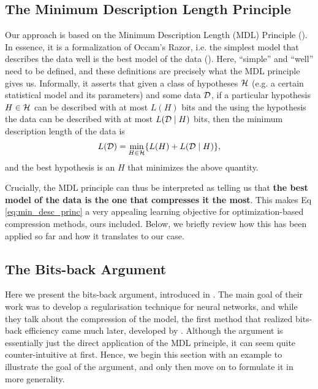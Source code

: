 \subsection{The Minimum Description Length Principle} 
\label{sec:mdl}
Our approach is based on the Minimum Description Length (MDL) Principle
(\cite{rissanen1986stochastic}). In essence, it is a formalization of Occam's
Razor, i.e. the simplest model that describes the data well is the best model of
the data (\cite{grünwald2007minimum}). Here, ``simple'' and ``well'' need to be
defined, and these definitions are precisely what the MDL principle gives us.
Informally, it asserts that given a class of hypotheses $\mathcal{H}$ (e.g. a certain
statistical model and its parameters) and some data $\mathcal{D}$, if a particular
hypothesis $H \in \mathcal{H}$ can be described with at most $L(H)$ bits and the using the
hypothesis the data can be described with at most $L(\mathcal{D} \mid H)$ bits, then the
minimum description length of the data is
\begin{equation}
\label{eq:min_desc_princ}
  L(\mathcal{D}) = \min_{H \in \mathcal{H}}\{ L(H) + L(\mathcal{D} \mid H) \},
\end{equation}
and the best hypothesis is an $H$ that minimizes the above quantity.
\par
Crucially, the MDL principle can thus be interpreted as telling us that
\textbf{the best model of the data is the one that compresses it the most}.
This makes Eq \ref{eq:min_desc_princ} a very appealing learning objective for
optimization-based compression methods, ours included.
Below, we briefly review how this has been applied so far and how it translates
to our case.
\subsection{The Bits-back Argument}
Here we present the bits-back argument, introduced in
\cite{hinton1993keeping}. The main goal of their work was to develop a
regularisation technique for neural networks, and while they talk about the
compression of the model, the first method that realized bits-back
 efficiency came much later, developed by \cite{havasi2018minimal}. 
Although the argument is essentially just the direct application of the MDL
principle, it can seem quite counter-intuitive at first. Hence, we begin this
section with an example to illustrate the goal of the argument,
and only then move on to formulate it in more generality.

